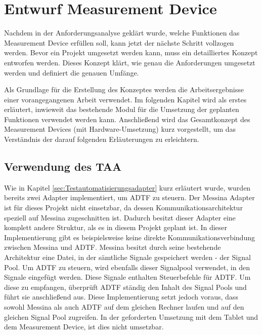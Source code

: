 \documentclass[12pt,a4paper]{report}
\begin{document}
\chapter{Entwurf Measurement Device}\label{chap:Konzeptentwurf Measurement Device}
Nachdem in der Anforderungsanalyse geklärt wurde, welche Funktionen das Measurement Device erfüllen soll, kann jetzt der nächste Schritt vollzogen werden. Bevor ein Projekt umgesetzt werden kann, muss ein detailliertes Konzept entworfen werden. Dieses Konzept klärt, wie genau die Anforderungen umgesetzt werden und definiert die genauen Umfänge.

Als Grundlage für die Erstellung des Konzeptes werden die Arbeitsergebnisse einer vorangegangenen Arbeit \cite{MasterEckerlebe} verwendet. Im folgenden Kapitel wird als erstes erläutert, inwieweit das bestehende Modul für die Umsetzung der geplanten Funktionen verwendet werden kann. Anschlie\ss end wird das Gesamtkonzept des Measurement Devices (mit Hardware-Umsetzung) kurz vorgestellt, um das Verständnis der darauf folgenden Er\-läu\-te\-rung\-en zu erleichtern.
\section{Verwendung des TAA}\label{chap:Verwendgung des TAA}
Wie in Kapitel \ref{sec:Testautomatisierungsadapter} kurz erläutert wurde, wurden bereits zwei Adapter implementiert, um ADTF zu steuern. Der Messina Adapter ist für dieses Projekt nicht einsetzbar, da dessen Kommunikationsarchitektur speziell auf Messina zugeschnitten ist. Dadurch besitzt dieser Adapter eine komplett andere Struktur, als es in diesem Projekt geplant ist. In dieser Implementierung gibt es beispielsweise keine direkte Kommunikationsverbindung zwischen Messina und ADTF. Messina besitzt durch seine bestehende Architektur eine Datei, in der sämtliche Signale gespeichert werden - der Signal Pool. Um ADTF zu steuern, wird ebenfalls dieser Signalpool verwendet, in den Signale eingefügt werden. Diese Signale enthalten Steuerbefehle für ADTF. Um diese zu empfangen, überprüft ADTF ständig den Inhalt des Signal Pools und führt sie anschlie\ss end aus. Diese Implementierung setzt jedoch voraus, dass sowohl Messina als auch ADTF auf dem gleichen Rechner laufen und auf den gleichen Signal Pool zugreifen. In der geforderten Umsetzung mit dem Tablet und dem Measurement Device, ist dies nicht umsetzbar.
\end{document}
